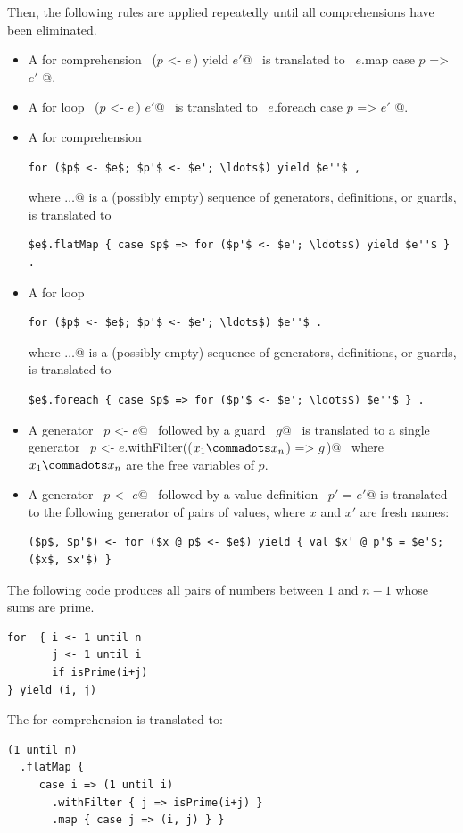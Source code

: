 Then, the following rules are applied repeatedly until all
comprehensions have been eliminated.
\begin{itemize}
\item
A for comprehension 
~\lstinline@for ($p$ <- $e\,$) yield $e'$@~ 
is translated to
~\lstinline@$e$.map { case $p$ => $e'$ }@.

\item
A for loop
~\lstinline@for ($p$ <- $e\,$) $e'$@~ 
is translated to
~\lstinline@$e$.foreach { case $p$ => $e'$ }@.

\item
A for comprehension
\begin{lstlisting}
for ($p$ <- $e$; $p'$ <- $e'; \ldots$) yield $e''$ ,
\end{lstlisting}
where \lstinline@$\ldots$@ is a (possibly empty)
sequence of generators, definitions, or guards,
is translated to
\begin{lstlisting}
$e$.flatMap { case $p$ => for ($p'$ <- $e'; \ldots$) yield $e''$ } .
\end{lstlisting}
\item
A for loop
\begin{lstlisting}
for ($p$ <- $e$; $p'$ <- $e'; \ldots$) $e''$ .
\end{lstlisting}
where \lstinline@$\ldots$@ is a (possibly empty)
sequence of generators, definitions, or guards,
is translated to
\begin{lstlisting}
$e$.foreach { case $p$ => for ($p'$ <- $e'; \ldots$) $e''$ } .
\end{lstlisting}
\item
A generator ~\lstinline@$p$ <- $e$@~ followed by a guard
~\lstinline@if $g$@~ is translated to a single generator 
~\lstinline@$p$ <- $e$.withFilter(($x_1 \commadots x_n$) => $g\,$)@~ where
$x_1 \commadots x_n$ are the free variables of $p$.
\item
A generator ~\lstinline@$p$ <- $e$@~ followed by a value definition 
~\lstinline@$p'$ = $e'$@ is translated to the following generator of pairs of values, where
$x$ and $x'$ are fresh names:
\begin{lstlisting}
($p$, $p'$) <- for ($x @ p$ <- $e$) yield { val $x' @ p'$ = $e'$; ($x$, $x'$) }
\end{lstlisting}
\end{itemize}

\example
The following code produces all pairs of numbers
between $1$ and $n-1$ whose sums are prime.
\begin{lstlisting}
for  { i <- 1 until n 
       j <- 1 until i 
       if isPrime(i+j)
} yield (i, j)
\end{lstlisting}
The for comprehension is translated to:
\begin{lstlisting}
(1 until n)
  .flatMap {
     case i => (1 until i)
       .withFilter { j => isPrime(i+j) }
       .map { case j => (i, j) } }
\end{lstlisting}

